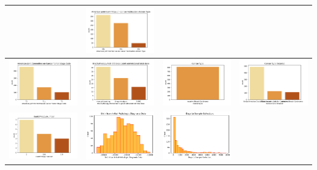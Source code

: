 \begin{table}[!h]
\begin{center}
\begin{tabular}{ |c|c|c|c| }
		& \includegraphics[width=.25\textwidth]{NOTEBOOK/IMAGENES_CRUDAS/8} 
		\\  \hline 
		  \includegraphics[width=.25\textwidth]{NOTEBOOK/IMAGENES_CRUDAS/9} 
		& \includegraphics[width=.25\textwidth]{NOTEBOOK/IMAGENES_CRUDAS/10} 
		& \includegraphics[width=.25\textwidth]{NOTEBOOK/IMAGENES_CRUDAS/11} 
		& \includegraphics[width=.25\textwidth]{NOTEBOOK/IMAGENES_CRUDAS/12} 
		\\  \hline 
		  \includegraphics[width=.25\textwidth]{NOTEBOOK/IMAGENES_CRUDAS/13} 
		& \includegraphics[width=.25\textwidth]{NOTEBOOK/IMAGENES_CRUDAS/14} 
		& \includegraphics[width=.25\textwidth]{NOTEBOOK/IMAGENES_CRUDAS/15} 

\end{tabular}
\end{center}
\end{table}
